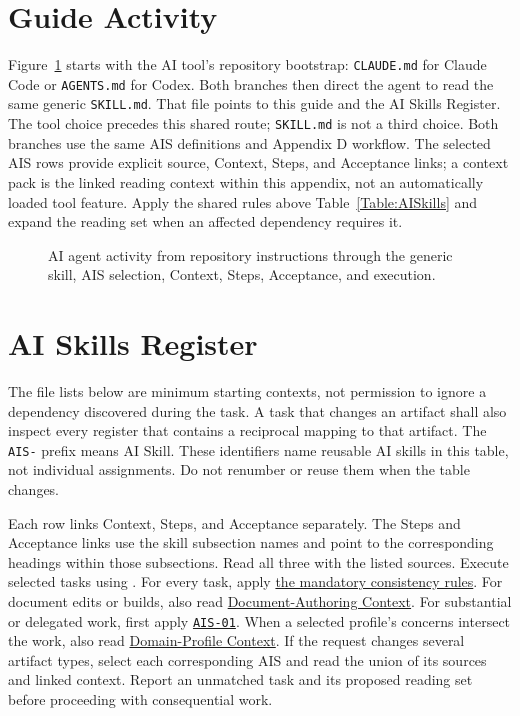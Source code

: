 \section{Guide Activity}
\label{Section:AIGuideActivity}
Figure~\ref{Figure:AIGuideActivity} starts with the AI tool's repository
bootstrap: \texttt{CLAUDE.md} for Claude Code or \texttt{AGENTS.md} for
Codex. Both branches then direct the agent to read the same generic
\texttt{SKILL.md}. That file points to this guide and the AI Skills Register.
The tool choice precedes this shared route; \texttt{SKILL.md} is not a third
choice. Both branches use the same AIS definitions and Appendix D workflow.
The selected AIS rows provide explicit source, Context, Steps, and Acceptance
links; a context pack
is the linked reading context within this appendix, not an automatically
loaded tool feature. Apply the shared rules above Table~\ref{Table:AISkills}
and expand the reading set when an affected dependency requires it.

\begin{figure}[htbp]
  \centering
  
  \caption{AI agent activity from repository instructions through the generic
  skill, AIS selection, Context, Steps, Acceptance, and execution.}
  \label{Figure:AIGuideActivity}
\end{figure}

\section{AI Skills Register}
The file lists below are minimum starting contexts, not permission to ignore a
dependency discovered during the task. A task that changes an artifact shall
also inspect every register that contains a reciprocal mapping to that
artifact. The \texttt{AIS-} prefix means AI Skill. These identifiers
name reusable AI skills in this table, not individual assignments. Do not
renumber or reuse them when the table changes.

Each row links Context, Steps, and Acceptance separately. The Steps and
Acceptance links use the skill subsection names and point to the corresponding
headings within those subsections. Read all three with the listed sources. Execute selected tasks using .
For every task, apply \hyperref[Section:AIConsistencyRules]{the mandatory
consistency rules}. For document edits or builds, also read
\hyperref[Section:AIDocumentContext]{Document-Authoring Context}. For
substantial or delegated work, first apply \hyperref[Skill:AIS-01]{\texttt{AIS-01}}. When a selected
profile's concerns intersect the work, also read
\hyperref[Section:AIDomainContext]{Domain-Profile Context}. If the request
changes several artifact types, select each corresponding AIS and read the
union of its sources and linked context. Report an unmatched task and its
proposed reading set before proceeding with consequential work.

